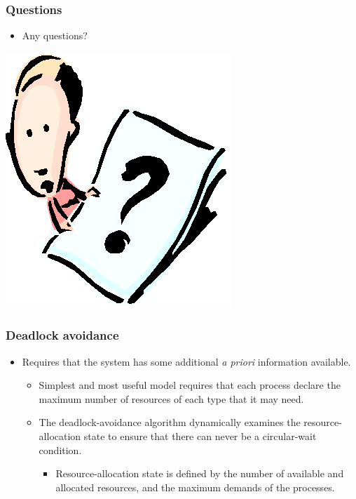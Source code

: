 \documentclass[CJKutf8,xcolor=pdftex,dvipsnames,table]{beamer}
\begin{document}
\begin{CJK*}{UTF8}{song}
  \begin{frame}
  \frametitle{Questions}
  \begin{itemize}
  \item{Any questions?}
  \end{itemize}
  \begin{center}
    \includegraphics[scale=.8]{question}
  \end{center}
  \end{frame}
  
  \begin{frame}
  \frametitle{Deadlock avoidance} \pause
  \begin{itemize}
  \item{Requires that the system has some additional \emph{a priori} information available.} \pause
    \begin{itemize}
    \item{Simplest and most useful model requires that each process declare the maximum number of resources of each type that it may need.} \pause
    \item{The deadlock-avoidance algorithm dynamically examines the resource-allocation state to ensure that there can never be a circular-wait condition.} \pause
      \begin{itemize}
      \item{Resource-allocation state is defined by the number of available and allocated resources, and the maximum demands of the processes.}
      \end{itemize}
    \end{itemize}
  \end{itemize}
  \end{frame}
  

\end{CJK*}
\end{document}
